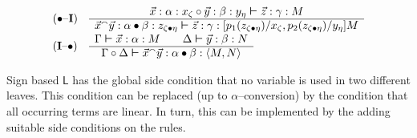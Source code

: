 \begin{table}
$$\begin{array}{l@{\quad}l}
\mbox{($\bullet$--\textbf{I})} &
    \begin{array}{c}
        \vec{x} : \alpha : x_{\zeta} \circ
        \vec{y} : \beta : y_{\eta} \bvdash \vec{z} : \gamma : M
    \\\hline
            \vec{x}\conc \vec{y} : \alpha \bullet \beta :
        z_{\zeta \bullet \eta} \bvdash \vec{z} : \gamma
        : [p_1(z_{\zeta \bullet \eta})/x_{\zeta},
        p_2(z_{\zeta \bullet \eta})/y_{\eta}]M
                \end{array} \\
\mbox{(\textbf{I}--$\bullet$)} & \begin{array}{c}
        \Gamma \bvdash \vec{x} : \alpha : M \qquad
    \Delta \bvdash \vec{y} : \beta : N \\\hline
            \Gamma \circ \Delta \bvdash \vec{x} \conc \vec{y} :
        \alpha \bullet \beta :
        \auf M, N\zu
                \end{array} \\
\end{array}$$
\end{table}
Sign based $\mathsf{L}$ has the global side condition that no variable 
is used in two different leaves. This condition can be replaced (up to 
$\alpha$--conversion) by the condition that all occurring terms are 
linear. In turn, this can be implemented by the adding suitable side 
conditions on the rules. 

